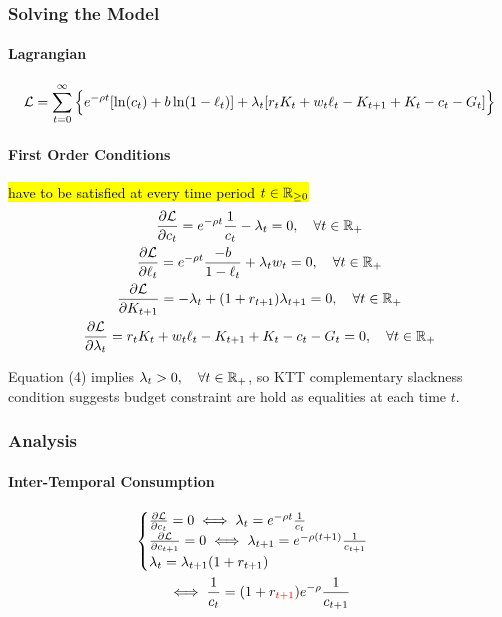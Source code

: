 \documentclass[11pt]{article}
\begin{document}
			\subsubsection{Solving the Model}
			\paragraph{Lagrangian}
			\begin{gather}
				\mathcal{{L}} = \sum_{t=0}^\infty \Big\{e^{-\rho t} [\ln(c_t) + b\ln(1-\ell_t)]
				+ \lambda_t [r_t K_t + w_t \ell_t - K_{t+1} + K_t - c_t - G_t] \Big\}
			\end{gather}
			\paragraph{First Order Conditions}\hl{have to be satisfied at every time period $t \in \mathbb{R}_{\geq 0}$}
			\begin{gather}
				\frac{\partial{\mathcal{{L}}}}{\partial{c_t}} = e^{-\rho t}\frac{1}{c_t} - \lambda_t = 0,\quad \forall t \in \mathbb{R}_+ \\
				\frac{\partial{\mathcal{{L}}}}{\partial{\ell_t}} = e^{-\rho t} \frac{-b}{1-\ell_t} + \lambda_t w_t = 0,\quad \forall t \in \mathbb{R}_+ \\
				\frac{\partial{\mathcal{{L}}}}{\partial{K_{t+1}}} = -\lambda_t + (1+r_{t+1})\lambda_{t+1} = 0,\quad \forall t \in \mathbb{R}_+ \\
				\frac{\partial{\mathcal{{L}}}}{\partial{\lambda_t}} = r_t K_t + w_t \ell_t - K_{t+1} + K_t - c_t - G_t = 0,\quad \forall t \in \mathbb{R}_+
			\end{gather}
			\begin{remark}
				Equation (4) implies $\lambda_t > 0,\quad \forall t \in \mathbb{R}_+$, so KTT complementary slackness condition suggests budget constraint are hold as equalities at each time $t$.
			\end{remark}
			
			\subsubsection{Analysis}
			
			\paragraph{Inter-Temporal Consumption}
				\begin{gather*}
					\begin{cases}
						\frac{\partial{\mathcal{{L}}}}{\partial{c_t}} = 0 \iff \lambda_t = e^{-\rho t}\frac{1}{c_t} \\
						\frac{\partial{\mathcal{{L}}}}{\partial{c_{t+1}}} = 0 \iff \lambda_{t+1} = e^{-\rho (t+1)}\frac{1}{c_{t+1}} \\
						\lambda_t = \lambda_{t+1}(1+r_{t+1})
					\end{cases}\\
					\iff \frac{1}{c_t} = (1+r_{\textcolor{red}{t+1}})e^{-\rho}\frac{1}{c_{t+1}}
				\end{gather*}
				
\end{document}
